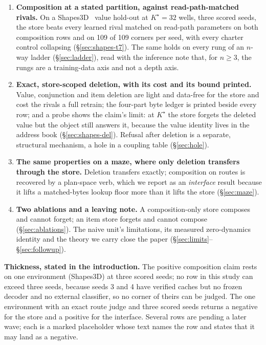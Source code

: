 \documentclass{article} %
\newcommand{\Kstar}{\ensuremath{K^{\star}}}
\begin{document}
\begin{enumerate}[leftmargin=*,itemsep=2pt]
\item \textbf{Composition at a stated partition, against read-path-matched rivals.} On a
  Shapes3D~\citep{burgess2018shapes,kim2018disentangling} value hold-out at $\Kstar=32$ wells, three scored seeds, the store beats every %
  learned rival matched on read-path parameters on both composition rows and on 109 of 109 %
  corners per seed, with every charter control collapsing
  (\S\ref{sec:shapes-t7}). The same holds on every rung of an $n$-way ladder
  (\S\ref{sec:ladder}), read with the inference note that, for $n\ge3$, the rungs are a
  training-data axis and not a depth axis.
\item \textbf{Exact, store-scoped deletion, with its cost and its bound printed.} Value,
  conjunction and item deletion are light and data-free for the store and cost the rivals a
  full retrain; the four-part byte ledger is printed beside every row; and a probe shows the
  claim's limit: at $\Kstar$ the store forgets the deleted value but the object still answers
  it, because the value identity lives in the address book (\S\ref{sec:shapes-del}).
  Refusal after deletion is a separate, structural mechanism, a hole in a coupling table
  (\S\ref{sec:hole}).
\item \textbf{The same properties on a maze, where only deletion transfers through the
  store.} Deletion transfers exactly; composition on routes is recovered by a plan-space
  verb, which we report as an \emph{interface} result because it lifts a matched-bytes lookup
  floor more than it lifts the store (\S\ref{sec:maze}).
\item \textbf{Two ablations and a leaving note.} A composition-only store composes and cannot
  forget; an item store forgets and cannot compose (\S\ref{sec:ablations}). The naive unit's
  limitations, its measured zero-dynamics identity and the theory we carry close the paper
  (\S\ref{sec:limits}--\S\ref{sec:followup}).
\end{enumerate}

\noindent\textbf{Thickness, stated in the introduction.} The positive composition claim rests
on one environment (Shapes3D) at three scored seeds; no row in this study can exceed three
seeds, because seeds 3 and 4 have verified caches but no frozen decoder and no external
classifier, so no corner of theirs can be judged. %
The one environment with an exact route judge and three scored seeds returns a negative for
the store and a positive for the interface. Several rows are pending a later wave; each is a
marked placeholder whose text names the row and states that it may land as a negative.
\end{document}
